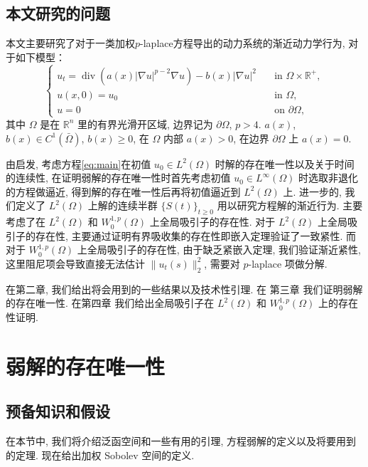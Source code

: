 \documentclass[oneside,longtitle]{LZUthesis}
\numberwithin{equation}{chapter}
\newcommand*\abs[1]{\lvert#1\rvert}
\newcommand*\norm[1]{\lVert#1\rVert}
\newcommand*\Brace[1]{\lbrace#1\rbrace}
\newcommand\R{\mathbb{R}}
\DeclareMathOperator{\Div}{div}
\begin{document}
\section{本文研究的问题}
本文主要研究了对于一类加权$p$-laplace方程导出的动力系统的渐近动力学行为,
对于如下模型：
\begin{equation}\label{eq:main}
	\begin{cases}
		u_t = \Div(a(x)\abs{\nabla u}^{p-2}\nabla u) - b(x)\abs{\nabla u}^2 \quad &\text{in } \Omega \times \R^+,\\
		u(x,0) = u_0 \quad &\text{in } \Omega,\\
		u = 0 \quad &\text{on } \partial\Omega,
	\end{cases}
\end{equation}
其中 $\Omega$ 是在 $\R^{n}$ 里的有界光滑开区域, 边界记为 $\partial\Omega$, $p>4$.
$ a(x)$, $b(x) \in C^1(\bar{\Omega}) $, $b(x) \geq 0$, 在 $\Omega$ 内部 $a(x) > 0$, 在边界 $\partial\Omega$ 上 $a(x) = 0$.

由\citep{Zhan2019Uniquenessa}启发, 考虑方程\eqref{eq:main}在初值 $u_0 \in L^2(\Omega)$ 时解的存在唯一性以及关于时间的连续性,
在证明弱解的存在唯一性时首先考虑初值 $u_0 \in L^\infty(\Omega)$ 时选取非退化的方程做逼近,
得到解的存在唯一性后再将初值逼近到 $L^2(\Omega)$ 上.
进一步的, 我们定义了 $L^2(\Omega) $ 上解的连续半群 $\Brace{S(t)}_{t \geq 0} $ 用以研究方程解的渐近行为.
主要考虑了在 $L^2(\Omega)$ 和 $W_0^{1, p}(\Omega)$ 上全局吸引子的存在性.
对于 $L^2(\Omega)$ 上全局吸引子的存在性,
主要通过证明有界吸收集的存在性即嵌入定理验证了一致紧性.
而对于 $W_0^{1, p}(\Omega)$ 上全局吸引子的存在性,
由于缺乏紧嵌入定理, 我们验证渐近紧性, 这里阻尼项会导致直接无法估计
$\norm{u_t(s)}_2^2$, 需要对 $p$-laplace 项做分解.

在第二章,
我们给出将会用到的一些结果以及技术性引理. 在
第三章
我们证明弱解的存在唯一性.
在第四章
我们给出全局吸引子在
$L^2(\Omega)$ 和 $W_0^{1,p}(\Omega)$ 上的存在性证明.

\chapter{弱解的存在唯一性}\label{ch:Existence_and_uniqueness_of_the_weak_solution}
\section{预备知识和假设}\label{ch:preliminaries}
在本节中, 我们将介绍泛函空间和一些有用的引理,
方程弱解的定义以及将要用到的定理.
现在给出加权 Sobolev 空间的定义.
\end{document}
